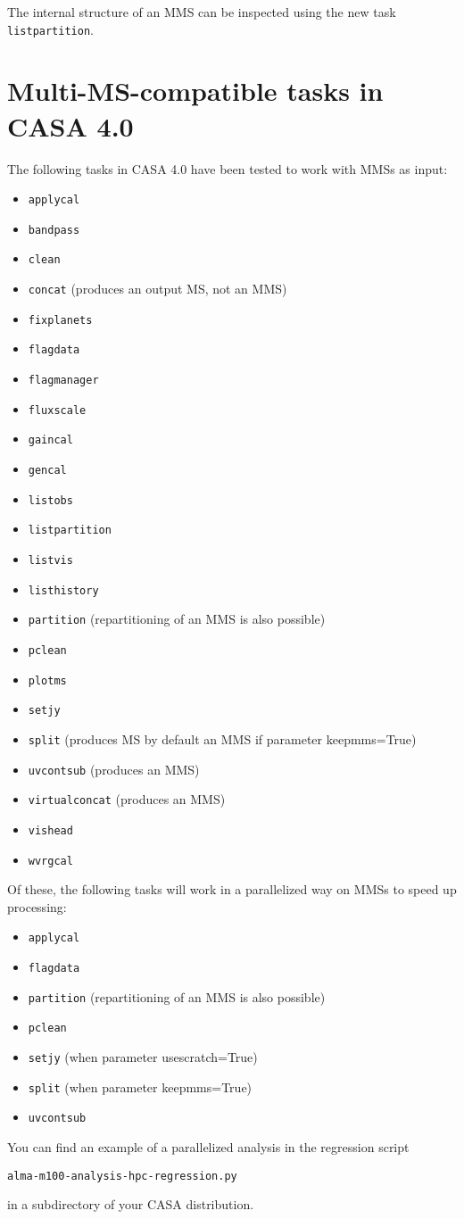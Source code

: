 The internal structure of an MMS can be inspected using the new task {\tt listpartition}.

\section{Multi-MS-compatible tasks in CASA 4.0}

The following tasks in CASA 4.0 have been tested to work with MMSs as input:
\begin{itemize}
\item {\tt applycal}
\item {\tt bandpass}
\item {\tt clean}
\item {\tt concat} (produces an output MS, not an MMS)
\item {\tt fixplanets}
\item {\tt flagdata}
\item {\tt flagmanager}
\item {\tt fluxscale}
\item {\tt gaincal}
\item {\tt gencal}
\item {\tt listobs}
\item {\tt listpartition}
\item {\tt listvis}
\item {\tt listhistory}
\item {\tt partition} (repartitioning of an MMS is also possible)
\item {\tt pclean}
\item {\tt plotms}
\item {\tt setjy}
\item {\tt split} (produces MS by default an MMS if parameter keepmms=True)
\item {\tt uvcontsub} (produces an MMS)
\item {\tt virtualconcat} (produces an MMS)
\item {\tt vishead}
\item {\tt wvrgcal}
\end{itemize}
Of these, the following tasks will work in a parallelized way on MMSs
to speed up processing:
\begin{itemize}
\item {\tt applycal}
\item {\tt flagdata}
\item {\tt partition} (repartitioning of an MMS is also possible)
\item {\tt pclean}
\item {\tt setjy} (when parameter usescratch=True)
\item {\tt split} (when parameter keepmms=True)
\item {\tt uvcontsub}
\end{itemize}
You can find an example of a parallelized analysis in the regression script
\begin{center}
{\tt alma-m100-analysis-hpc-regression.py} 
\end{center}
in a subdirectory of your CASA distribution.

